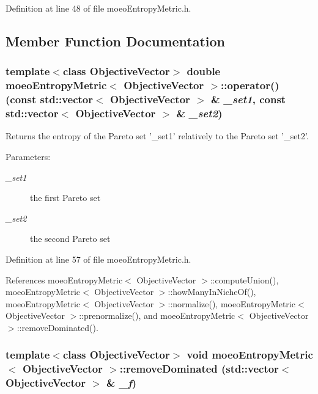 Definition at line 48 of file moeo\-Entropy\-Metric.h.

\subsection{Member Function Documentation}
\subsubsection{\setlength{\rightskip}{0pt plus 5cm}template$<$class Objective\-Vector$>$ double \bf{moeo\-Entropy\-Metric}$<$ Objective\-Vector $>$::operator() (const std::vector$<$ Objective\-Vector $>$ \& {\em \_\-set1}, const std::vector$<$ Objective\-Vector $>$ \& {\em \_\-set2})\hspace{0.3cm}{\tt  [inline]}}\label{classmoeoEntropyMetric_191a8cdda7873e20338e678c5a7b927b}


Returns the entropy of the Pareto set '\_\-set1' relatively to the Pareto set '\_\-set2'. 

\begin{Desc}
\item[Parameters:]
\begin{description}
\item[{\em \_\-set1}]the first Pareto set \item[{\em \_\-set2}]the second Pareto set \end{description}
\end{Desc}


Definition at line 57 of file moeo\-Entropy\-Metric.h.

References moeo\-Entropy\-Metric$<$ Objective\-Vector $>$::compute\-Union(), moeo\-Entropy\-Metric$<$ Objective\-Vector $>$::how\-Many\-In\-Niche\-Of(), moeo\-Entropy\-Metric$<$ Objective\-Vector $>$::normalize(), moeo\-Entropy\-Metric$<$ Objective\-Vector $>$::prenormalize(), and moeo\-Entropy\-Metric$<$ Objective\-Vector $>$::remove\-Dominated().
\subsubsection{\setlength{\rightskip}{0pt plus 5cm}template$<$class Objective\-Vector$>$ void \bf{moeo\-Entropy\-Metric}$<$ Objective\-Vector $>$::remove\-Dominated (std::vector$<$ Objective\-Vector $>$ \& {\em \_\-f})\hspace{0.3cm}{\tt  [inline, private]}}\label{classmoeoEntropyMetric_198a717fd0bab0bb91346399c1021f82}


